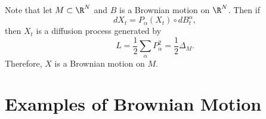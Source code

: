 \begin{rmk}
    Note that let $M \subset \R^N$ and $B$ is a Brownian motion on $\R^N$. Then if 
    \begin{equation*}
        dX_t = P_\alpha(X_t) \circ dB^\alpha_t,
    \end{equation*}
    then $X_t$ is a diffusion process generated by
    \begin{equation*}
        L = \frac{1}{2}\sum_\alpha P_\alpha^2 = \frac{1}{2} \Delta_M.
    \end{equation*}
    Therefore, $X$ is a Brownian motion on $M$.
\end{rmk}

\section{Examples of Brownian Motion}


